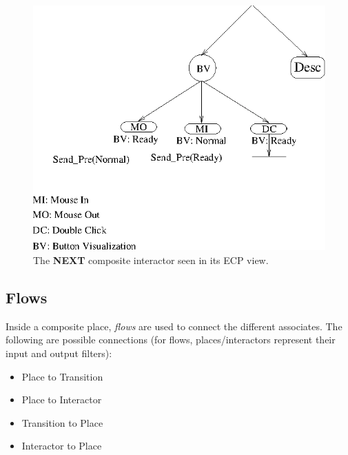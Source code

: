 \documentclass[twocolumn,10pt]{article}
\newcommand{\theEnd}{{\tt end}}
\newcommand{\event}[1]{{\tt #1}}
\newcommand{\elmt}[1]{{\bf #1}}
\begin{document}


\begin{figure}[bt]
    \centering
    \includegraphics{figures/compositeInteractor.eps}%
    \caption{The \elmt{NEXT} composite interactor seen in its ECP view.}
    \label{fig:compositeInteractor}
\end{figure}
\vspace*{-0.5cm}
\textbf{\textit{}}

\subsection{Flows}

Inside a composite place, {\em flows} are used to connect the
different associates.  The following are possible connections (for
flows, places/interactors represent their input and output filters):
%
\begin{itemize}
\parskip 0pt
\item Place to Transition
\item Place to Interactor
\item Transition to Place
\item Interactor to Place
\end{itemize}
%
\end{document}
